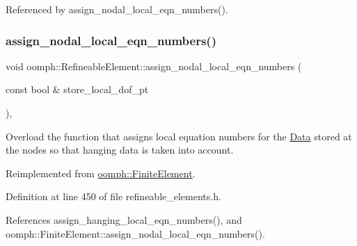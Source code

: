 Referenced by assign\+\_\+nodal\+\_\+local\+\_\+eqn\+\_\+numbers().

\mbox{\label{classoomph_1_1RefineableElement_ab2ac14f6019818fc4efb411e9486ae3c}} 
\subsubsection{\texorpdfstring{assign\+\_\+nodal\+\_\+local\+\_\+eqn\+\_\+numbers()}{assign\_nodal\_local\_eqn\_numbers()}}
{\footnotesize\ttfamily void oomph\+::\+Refineable\+Element\+::assign\+\_\+nodal\+\_\+local\+\_\+eqn\+\_\+numbers (\begin{DoxyParamCaption}\item[{const bool \&}]{store\+\_\+local\+\_\+dof\+\_\+pt }\end{DoxyParamCaption})\hspace{0.3cm}{\ttfamily [inline]}, {\ttfamily [virtual]}}



Overload the function that assigns local equation numbers for the \hyperlink{classoomph_1_1Data}{Data} stored at the nodes so that hanging data is taken into account. 



Reimplemented from \hyperlink{classoomph_1_1FiniteElement_a4136e6f2a0d782f4c23540d71050db30}{oomph\+::\+Finite\+Element}.



Definition at line 450 of file refineable\+\_\+elements.\+h.



References assign\+\_\+hanging\+\_\+local\+\_\+eqn\+\_\+numbers(), and oomph\+::\+Finite\+Element\+::assign\+\_\+nodal\+\_\+local\+\_\+eqn\+\_\+numbers().

\mbox{\label{classoomph_1_1RefineableElement_adc31f0903b4cbd9574017dda44cf6523}} 
